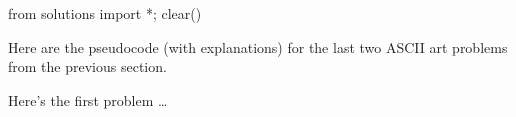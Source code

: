 \begin{python0}
from solutions import *; clear()
\end{python0}

Here are the pseudocode (with explanations) for the last two ASCII art problems from the previous section.

Here's the first problem \ldots

